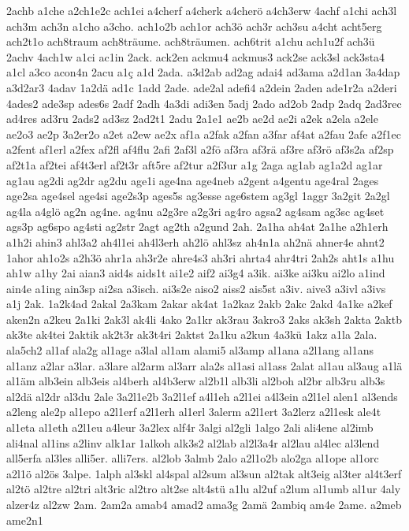 {2achb
a1che
a2ch1e2c
ach1ei
a4cherf
a4cherk
a4cherö
a4ch3erw
4achf
a1chi
ach3l
ach3m
ach3n
a1cho
a3cho.
ach1o2b
ach1or
ach3ö
ach3r
ach3su
a4cht
acht5erg
ach2t1o
ach8traum
ach8träume.
ach8träumen.
ach6trit
a1chu
ach1u2f
ach3ü
2achv
4ach1w
a1ci
ac1in
2ack.
ack2en
ackmu4
ackmus3
ack2se
ack3sl
ack3sta4
a1cl
a3co
acon4n
2acu
a1ç
a1d
2ada.
a3d2ab
ad2ag
adai4
ad3ama
a2d1an
3a4dap
a3d2ar3
4adav
1a2dä
ad1c
1add
2ade.
ade2al
adefi4
a2dein
2aden
ade1r2a
a2deri
4ades2
ade3sp
ades6s
2adf
2adh
4a3di
adi3en
5adj
2ado
ad2ob
2adp
2adq
2ad3rec
ad4res
ad3ru
2ads2
ad3sz
2ad2t1
2adu
2a1e1
ae2b
ae2d
ae2i
a2ek
a2ela
a2ele
ae2o3
ae2p
3a2er2o
a2et
a2ew
ae2x
af1a
a2fak
a2fan
a3far
af4at
a2fau
2afe
a2f1ec
a2fent
af1erl
a2fex
af2fl
af4flu
2afi
2af3l
a2fö
af3ra
af3rä
af3re
af3rö
af3s2a
af2sp
af2t1a
af2tei
af4t3erl
af2t3r
aft5re
af2tur
a2f3ur
a1g
2aga
ag1ab
ag1a2d
ag1ar
ag1au
ag2di
ag2dr
ag2du
age1i
age4na
age4neb
a2gent
a4gentu
age4ral
2ages
age2sa
age4sel
age4si
age2s3p
ages5s
ag3esse
age6stem
ag3gl
1aggr
3a2git
2a2gl
ag4la
a4glö
ag2n
ag4ne.
ag4nu
a2g3re
a2g3ri
ag4ro
agsa2
ag4sam
ag3sc
ag4set
ags3p
ag6spo
ag4sti
ag2str
2agt
ag2th
a2gund
2ah.
2a1ha
ah4at
2a1he
a2h1erh
a1h2i
ahin3
ahl3a2
ah4l1ei
ah4l3erh
ah2lö
ahl3sz
ah4n1a
ah2nä
ahner4e
ahnt2
1ahor
ah1o2s
a2h3ö
ahr1a
ah3r2e
ahre4s3
ah3ri
ahrta4
ahr4tri
2ah2s
aht1s
a1hu
ah1w
a1hy
2ai
aian3
aid4s
aids1t
ai1e2
aif2
ai3g4
a3ik.
ai3ke
ai3ku
ai2lo
a1ind
ain4e
a1ing
ain3sp
ai2sa
a3isch.
ai3s2e
aiso2
aiss2
ais5st
a3iv.
aive3
a3ivl
a3ivs
a1j
2ak.
1a2k4ad
2akal
2a3kam
2akar
ak4at
1a2kaz
2akb
2akc
2akd
4a1ke
a2kef
aken2n
a2keu
2a1ki
2ak3l
ak4li
4ako
2a1kr
ak3rau
3akro3
2aks
ak3sh
2akta
2aktb
ak3te
ak4tei
2aktik
ak2t3r
ak3t4ri
2aktst
2a1ku
a2kun
4a3kü
1akz
a1la
2ala.
ala5ch2
al1af
ala2g
al1age
a3lal
al1am
alami5
al3amp
al1ana
a2l1ang
al1ans
al1anz
a2lar
a3lar.
a3lare
al2arm
al3arr
ala2s
al1asi
al1ass
2alat
al1au
al3aug
a1lä
al1äm
alb3ein
alb3eis
al4berh
al4b3erw
al2b1l
alb3li
al2boh
al2br
alb3ru
alb3s
al2dä
al2dr
al3du
2ale
3a2l1e2b
3a2l1ef
a4l1eh
a2l1ei
a4l3ein
a2l1el
alen1
al3ends
a2leng
ale2p
al1epo
a2l1erf
a2l1erh
al1erl
3alerm
a2l1ert
3a2lerz
a2l1esk
ale4t
al1eta
al1eth
a2l1eu
a4leur
3a2lex
alf4r
3algi
al2gli
1algo
2ali
ali4ene
al2imb
ali4nal
al1ins
a2linv
alk1ar
1alkoh
alk3s2
al2lab
al2l3a4r
al2lau
al4lec
al3lend
all5erfa
al3les
alli5er.
alli7ers.
al2lob
3almb
2alo
a2l1o2b
alo2ga
al1ope
al1orc
a2l1ö
al2ös
3alpe.
1alph
al3skl
al4spal
al2sum
al3sun
al2tak
alt3eig
al3ter
al4t3erf
al2tö
al2tre
al2tri
alt3ric
al2tro
alt2se
alt4stü
a1lu
al2uf
a2lum
al1umb
al1ur
4aly
alzer4z
al2zw
2am.
2am2a
amab4
amad2
ama3g
2amä
2ambiq
am4e
2ame.
a2meb
ame2n1
}
